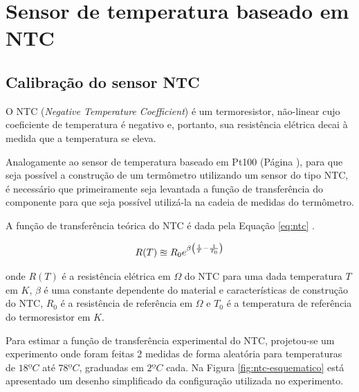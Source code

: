 \documentclass[a4paper]{instrumentacao}
\begin{document}


\section{Sensor de temperatura baseado em NTC}
\label{ch:ntc}
\subsection{Calibração do sensor NTC}
O NTC (\textit{Negative Temperature Coefficient}) é um termoresistor, não-linear cujo coeficiente de temperatura é negativo e, portanto, sua resistência elétrica decai à medida que a temperatura se eleva.

Analogamente ao sensor de temperatura baseado em Pt100 (Página \pageref{ch:pt100}), para que seja possível a construção de um termômetro utilizando um sensor do tipo NTC, é necessário que primeiramente seja levantada a função de transferência do componente para que seja possível utilizá-la na cadeia de medidas do termômetro.

A função de transferência teórica do NTC é dada pela Equação \ref{eq:ntc} \cite{livro-texto}.

\begin{equation}
	\large
	R(T) \approxeq R_0 e^{\beta\left(\frac{1}{T} - \frac{1}{T_0}\right)}
	\label{eq:ntc}
\end{equation}

\noindent
onde $R(T)$ é a resistência elétrica em $\Omega$ do NTC para uma dada temperatura $T$ em $K$, $\beta$ é uma constante dependente do material e características de construção do NTC, $R_0$ é a resistência de referência em $\Omega$ e $T_0$ é a temperatura de referência do termoresistor em $K$.

Para estimar a função de transferência experimental do NTC, projetou-se um experimento onde foram feitas 2 medidas de forma aleatória para temperaturas de $18ºC$ até $78ºC$, graduadas em $2ºC$ cada. Na Figura \ref{fig:ntc-esquematico} está apresentado um desenho simplificado da configuração utilizada no experimento.
\end{document}

